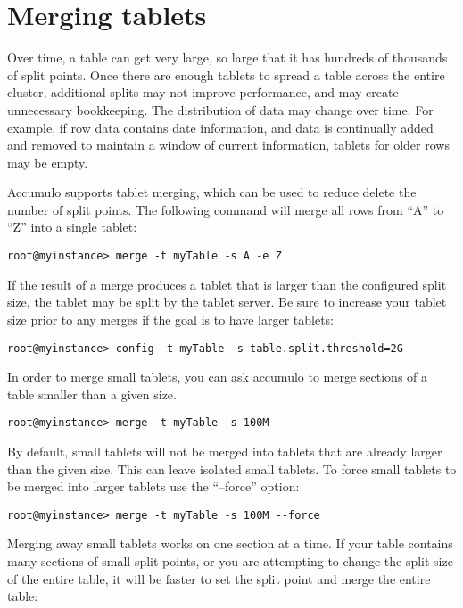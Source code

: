 \section{Merging tablets}

Over time, a table can get very large, so large that it has hundreds
of thousands of split points.  Once there are enough tablets to spread
a table across the entire cluster, additional splits may not improve
performance, and may create unnecessary bookkeeping.  The distribution
of data may change over time.  For example, if row data contains date
information, and data is continually added and removed to maintain a
window of current information, tablets for older rows may be empty.

Accumulo supports tablet merging, which can be used to reduce delete
the number of split points.  The following command will merge all rows
from ``A'' to ``Z'' into a single tablet:

\small
\begin{verbatim}
root@myinstance> merge -t myTable -s A -e Z
\end{verbatim}
\normalsize

If the result of a merge produces a tablet that is larger than the
configured split size, the tablet may be split by the tablet server.
Be sure to increase your tablet size prior to any merges if the goal
is to have larger tablets:

\small
\begin{verbatim}
root@myinstance> config -t myTable -s table.split.threshold=2G
\end{verbatim}
\normalsize

In order to merge small tablets, you can ask accumulo to merge
sections of a table smaller than a given size.

\small
\begin{verbatim}
root@myinstance> merge -t myTable -s 100M
\end{verbatim}
\normalsize

By default, small tablets will not be merged into tablets that are
already larger than the given size.  This can leave isolated small
tablets.  To force small tablets to be merged into larger tablets use
the ``--force'' option:

\small
\begin{verbatim}
root@myinstance> merge -t myTable -s 100M --force
\end{verbatim}
\normalsize

Merging away small tablets works on one section at a time.  If your
table contains many sections of small split points, or you are
attempting to change the split size of the entire table, it will be
faster to set the split point and merge the entire table:


